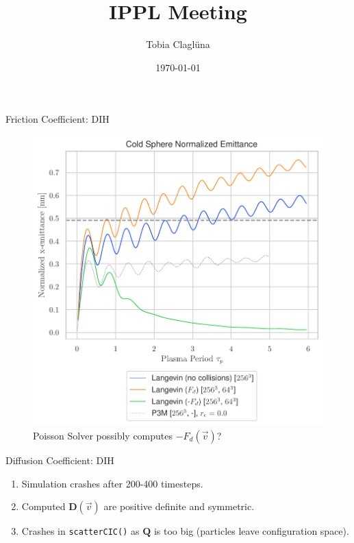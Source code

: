 

\title[\today]{IPPL Meeting}

\author{Tobia Claglüna}
\date{\today}
\def \myEmail {tobia.clagluena@psi.ch}





\begin{frame}[c]{Friction Coefficient: DIH}
    \begin{figure}[!htb]
        \centering
        \captionsetup{justification=centering}
      \includegraphics[width=0.6\linewidth]{figures/friction_Nemittance.pdf}
      \caption{Poisson Solver possibly computes $ - F_d(\vec v)$?}
      \label{fig:Fd_DIH}
    \end{figure}
\end{frame}

\begin{frame}[c]{Diffusion Coefficient: DIH}
    \begin{enumerate}[$\cdot$]
        \item Simulation crashes after 200-400 timesteps.
        \item Computed $\boldsymbol D(\vec v)$ are positive definite and symmetric.
        \item Crashes in \texttt{scatterCIC()} as $\boldsymbol Q$ is too big (particles leave configuration space).
    \end{enumerate}
\end{frame}

